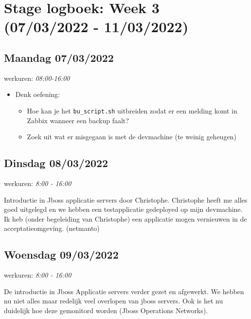 
\hypertarget{stage-logboek-week-3-07032022---11032022}{%
\section{Stage logboek: Week 3 (07/03/2022 -
11/03/2022)}\label{stage-logboek-week-3-07032022---11032022}}

\hypertarget{maandag-07032022}{%
\subsection{Maandag 07/03/2022}\label{maandag-07032022}}

werkuren: \emph{08:00-16:00}

\begin{itemize}
\tightlist
\item
  Denk oefening:

  \begin{itemize}
  \tightlist
  \item
    Hoe kan je het \texttt{bu\_script.sh} uitbreiden zodat er een
    melding komt in Zabbix wanneer een backup faalt?
  \item
    Zoek uit wat er misgegaan is met de devmachine (te weinig geheugen)
  \end{itemize}
\end{itemize}

\hypertarget{dinsdag-08032022}{%
\subsection{Dinsdag 08/03/2022}\label{dinsdag-08032022}}

werkuren: \emph{8:00 - 16:00}

Introductie in Jboss applicatie servers door Christophe. Christophe
heeft me alles goed uitgelegd en we hebben een testapplicatie gedeployed
op mijn devmachine. Ik heb (onder begeleiding van Christophe) een
applicatie mogen vernieuwen in de acceptatieomgeving. (netmanto)

\hypertarget{woensdag-09032022}{%
\subsection{Woensdag 09/03/2022}\label{woensdag-09032022}}

werkuren: \emph{8:00 - 16:00}

De introductie in Jboss Applicatie servers verder gezet en afgewerkt. We
hebben nu niet alles maar redelijk veel overlopen van jboss servers. Ook
is het nu duidelijk hoe deze gemonitord worden (Jboss Operations
Networks).

